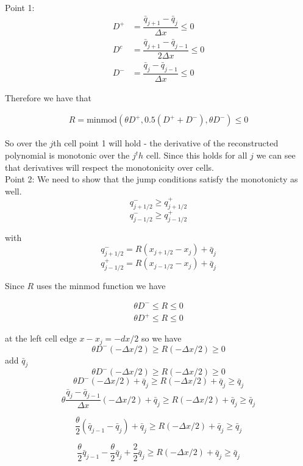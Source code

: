 \documentclass[10pt]{article}
\begin{document}
Point 1:
\begin{align}
D^+ &= \dfrac{\bar{q}_{j+1} - \bar{q}_{j}}{\Delta x}\le 0 \\
D^c &= \dfrac{\bar{q}_{j+1} - \bar{q}_{j-1}}{2\Delta x} \le 0 \\
D^- &= \dfrac{\bar{q}_{j} - \bar{q}_{j-1}}{\Delta x}  \le 0
\end{align}

Therefore we have that 

\begin{align}
R = \text{minmod}\left( \theta D^+,0.5\left(D^+ + D^-\right),\theta D^-\right) \le 0
\end{align}

So over the $j$th cell point 1 will hold - the derivative of the reconstructed polynomial is monotonic over the $j^th$ cell. Since this holds for all $j$ we can see that derivatives will respect the monotonicity over cells. \\

Point 2:
We need to show that the jump conditions satisfy the monotonicty as well. 
\[q^-_{j+1/2} \ge q^+_{j+1/2} \]
\[q^-_{j-1/2} \ge q^+_{j-1/2} \]

with 
\[q^-_{j+1/2} = R \left(x_{j+1/2} - x_{j}\right) + \bar{q}_{j} \]
\[q^+_{j-1/2} = R \left(x_{j-1/2} - x_{j}\right) + \bar{q}_{j} \]

Since $R$ uses the minmod function we have
	 
\begin{align}
\theta D^- \le R  \le 0 \\
\theta D^+ \le R  \le 0
\end{align}

at the left cell edge $x-x_j = -dx/2$ so we have
\[\theta D^- \left(- \Delta x/2\right) \ge R \left(-\Delta x/2\right)  \ge 0 \]
add $\bar{q}_{j}$
\[\theta D^- \left(-\Delta x/2\right) \ge R \left(-\Delta x/2\right)  \ge 0 \]
\[\theta D^- \left(-\Delta x/2\right) + \bar{q}_{j} \ge R \left(-\Delta x/2\right) + \bar{q}_{j}  \ge \bar{q}_{j} \]
\[\theta \dfrac{\bar{q}_{j} - \bar{q}_{j-1}}{\Delta x} \left(-\Delta x/2\right) + \bar{q}_{j} \ge R \left(-\Delta x/2\right) + \bar{q}_{j}  \ge \bar{q}_{j} \]

\[\frac{\theta}{2} \left(\bar{q}_{j-1} - \bar{q}_{j}  \right) + \bar{q}_{j} \ge R \left(-\Delta x/2\right) + \bar{q}_{j}  \ge \bar{q}_{j} \]

\[\frac{\theta}{2} \bar{q}_{j-1} - \frac{\theta}{2}\bar{q}_{j} + \frac{2}{2} \bar{q}_{j} \ge R \left(-\Delta x/2\right) + \bar{q}_{j}  \ge \bar{q}_{j} \]
\end{document}
